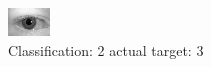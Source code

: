 \begin{figure}[h!]
\begin{center}
\includegraphics[width=0.60\columnwidth]{figures/ID615_class_2_target_3.png}
\end{center}
\caption{ Classification: 2 actual target: 3}
\label{fig:ID615_class_2_target_3}
\end{figure}
